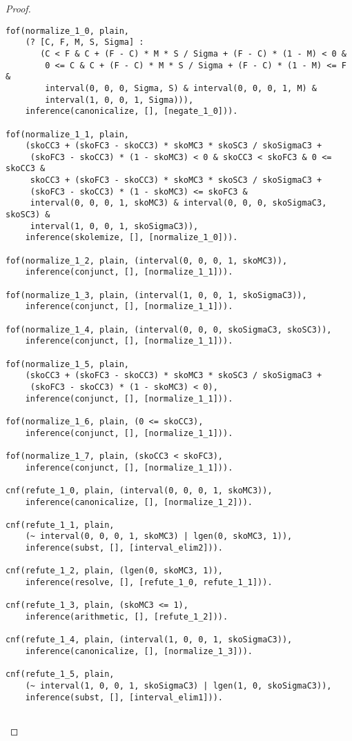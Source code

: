 \begin{proof}
\begin{verbatim}
fof(normalize_1_0, plain,
    (? [C, F, M, S, Sigma] :
       (C < F & C + (F - C) * M * S / Sigma + (F - C) * (1 - M) < 0 &
        0 <= C & C + (F - C) * M * S / Sigma + (F - C) * (1 - M) <= F &
        interval(0, 0, 0, Sigma, S) & interval(0, 0, 0, 1, M) &
        interval(1, 0, 0, 1, Sigma))),
    inference(canonicalize, [], [negate_1_0])).

fof(normalize_1_1, plain,
    (skoCC3 + (skoFC3 - skoCC3) * skoMC3 * skoSC3 / skoSigmaC3 +
     (skoFC3 - skoCC3) * (1 - skoMC3) < 0 & skoCC3 < skoFC3 & 0 <= skoCC3 &
     skoCC3 + (skoFC3 - skoCC3) * skoMC3 * skoSC3 / skoSigmaC3 +
     (skoFC3 - skoCC3) * (1 - skoMC3) <= skoFC3 &
     interval(0, 0, 0, 1, skoMC3) & interval(0, 0, 0, skoSigmaC3, skoSC3) &
     interval(1, 0, 0, 1, skoSigmaC3)),
    inference(skolemize, [], [normalize_1_0])).

fof(normalize_1_2, plain, (interval(0, 0, 0, 1, skoMC3)),
    inference(conjunct, [], [normalize_1_1])).

fof(normalize_1_3, plain, (interval(1, 0, 0, 1, skoSigmaC3)),
    inference(conjunct, [], [normalize_1_1])).

fof(normalize_1_4, plain, (interval(0, 0, 0, skoSigmaC3, skoSC3)),
    inference(conjunct, [], [normalize_1_1])).

fof(normalize_1_5, plain,
    (skoCC3 + (skoFC3 - skoCC3) * skoMC3 * skoSC3 / skoSigmaC3 +
     (skoFC3 - skoCC3) * (1 - skoMC3) < 0),
    inference(conjunct, [], [normalize_1_1])).

fof(normalize_1_6, plain, (0 <= skoCC3),
    inference(conjunct, [], [normalize_1_1])).

fof(normalize_1_7, plain, (skoCC3 < skoFC3),
    inference(conjunct, [], [normalize_1_1])).

cnf(refute_1_0, plain, (interval(0, 0, 0, 1, skoMC3)),
    inference(canonicalize, [], [normalize_1_2])).

cnf(refute_1_1, plain,
    (~ interval(0, 0, 0, 1, skoMC3) | lgen(0, skoMC3, 1)),
    inference(subst, [], [interval_elim2])).

cnf(refute_1_2, plain, (lgen(0, skoMC3, 1)),
    inference(resolve, [], [refute_1_0, refute_1_1])).

cnf(refute_1_3, plain, (skoMC3 <= 1),
    inference(arithmetic, [], [refute_1_2])).

cnf(refute_1_4, plain, (interval(1, 0, 0, 1, skoSigmaC3)),
    inference(canonicalize, [], [normalize_1_3])).

cnf(refute_1_5, plain,
    (~ interval(1, 0, 0, 1, skoSigmaC3) | lgen(1, 0, skoSigmaC3)),
    inference(subst, [], [interval_elim1])).


\end{verbatim}
\end{proof}
